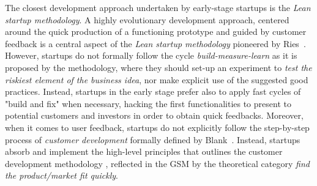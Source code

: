 \documentclass[10pt,journal,letterpaper,compsoc]{IEEEtran}
\begin{document}
The closest development approach undertaken by early-stage startups is the
\textit{Lean startup methodology}. A highly evolutionary development approach,
centered around the quick production of a functioning prototype and guided by
customer feedback is a central aspect of the \textit{Lean startup methodology}
pioneered by Ries~\cite{Ries2011}. However, startups do not formally follow the
cycle \textit{build-measure-learn} as it is proposed by the methodology, where
they should set-up an experiment to \textit{test the riskiest element of the
business idea}, nor make explicit use of the suggested good practices. Instead,
startups in the early stage prefer also to apply fast cycles of "build and fix"
when necessary, hacking the first functionalities to present to potential
customers and investors in order to obtain quick feedbacks. 
Moreover, when it comes to user feedback, startups do not explicitly follow 
the step-by-step process of \textit{customer development} formally defined by 
Blank~\cite{Blank2005}. Instead, startups absorb and implement the high-level
principles that outlines the customer development methodology
, reflected in the GSM by the theoretical category \textit{find the 
product/market fit quickly}.


\end{document}
